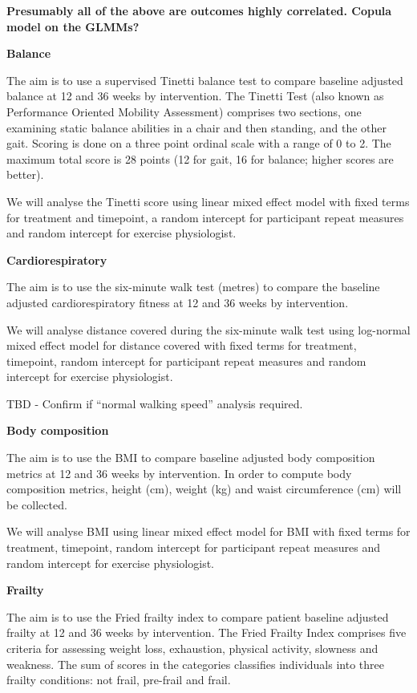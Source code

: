 \documentclass[11pt,parskip=half-]{scrartcl}
\begin{document}
\textbf{Presumably all of the above are outcomes highly correlated. Copula model on the GLMMs?}

\textbf{Balance}

The aim is to use a supervised Tinetti balance test to compare baseline adjusted balance at 12 and 36 weeks by intervention. The Tinetti Test (also known as Performance Oriented Mobility Assessment) comprises two sections, one examining static balance abilities in a chair and then standing, and the other gait. Scoring is done on a three point ordinal scale with a range of 0 to 2. The maximum total score is 28 points (12 for gait, 16 for balance; higher scores are better).

We will analyse the Tinetti score using linear mixed effect model with fixed terms for treatment and timepoint, a random intercept for participant repeat measures and random intercept for exercise physiologist.

\textbf{Cardiorespiratory}

The aim is to use the six-minute walk test (metres) to compare the baseline adjusted cardiorespiratory fitness at 12 and 36 weeks by intervention.

We will analyse distance covered during the six-minute walk test using log-normal mixed effect model for distance covered with fixed terms for treatment, timepoint, random intercept for participant repeat measures and random intercept for exercise physiologist.

TBD - Confirm if ``normal walking speed'' analysis required.

\textbf{Body composition}

The aim is to use the BMI to compare baseline adjusted body composition metrics at 12 and 36 weeks by intervention. In order to compute body composition metrics, height (cm), weight (kg) and waist circumference (cm) will be collected.

We will analyse BMI using linear mixed effect model for BMI with fixed terms for treatment, timepoint, random intercept for participant repeat measures and random intercept for exercise physiologist.

\textbf{Frailty}

The aim is to use the Fried frailty index to compare patient baseline adjusted frailty at 12 and 36 weeks by intervention. The Fried Frailty Index comprises five criteria for assessing weight loss, exhaustion, physical activity, slowness and weakness. The sum of scores in the categories classifies individuals into three frailty conditions: not frail, pre-frail and frail.
\end{document}
